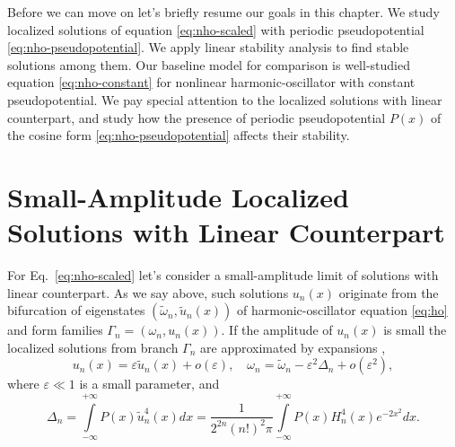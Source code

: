 Before we can move on let's briefly resume our goals in this chapter.
We study localized solutions of equation \eqref{eq:nho-scaled} with periodic pseudopotential \eqref{eq:nho-pseudopotential}.
We apply linear stability analysis to find stable solutions among them.
Our baseline model for comparison is well-studied equation \eqref{eq:nho-constant} for nonlinear harmonic-oscillator with constant pseudopotential.
We pay special attention to the localized solutions with linear counterpart, and study how the presence of periodic pseudopotential $P(x)$ of the cosine form \eqref{eq:nho-pseudopotential} affects their stability.

\section{Small-Amplitude Localized Solutions with Linear Counterpart}

For Eq.~\eqref{eq:nho-scaled} let's consider a small-amplitude limit of solutions with linear counterpart.
As we say above, such solutions $u_n(x)$ originate from the bifurcation of eigenstates $(\tilde{\omega}_n, \tilde{u}_n(x))$ of harmonic-oscillator equation \eqref{eq:ho} and form families $\Gamma_n = (\omega_n, u_n(x))$.
If the amplitude of $u_n(x)$ is small the localized solutions from branch $\Gamma_n$ are approximated by expansions \cite{ZezyulinAlfimovKonotopPerecGarcia2008},
\begin{equation}
	u_n(x) = \varepsilon \tilde{u}_n(x) + o(\varepsilon), \quad \omega_n = \tilde{\omega}_n - \varepsilon^2 \Delta_n + o(\varepsilon^2),
\label{eq:small-amplitude-expansion}
\end{equation}
where $\varepsilon \ll 1$ is a small parameter, and
\begin{equation}
	\Delta_n = \int \limits_{-\infty}^{+\infty} P(x) \tilde{u}_n^4(x) dx = \dfrac{1}{2^{2n} (n!)^2 \pi} \int \limits_{-\infty}^{+\infty} P(x) H_n^4(x) e^{-2x^2} dx.
\end{equation}

